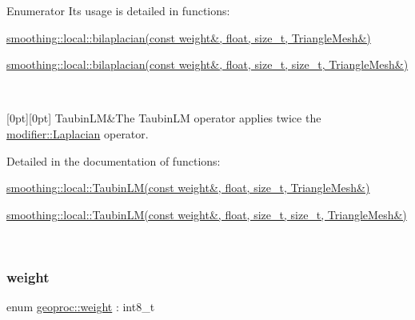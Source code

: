 \begin{DoxyEnumFields}{Enumerator}
Its usage is detailed in functions\+:
\begin{DoxyItemize}
\item \hyperlink{namespacegeoproc_1_1smoothing_1_1local_a5e2f0a2048d6fc14c372ea75bf70982f}{smoothing\+::local\+::bilaplacian(const weight\&, float, size\+\_\+t, Triangle\+Mesh\&)}
\item \hyperlink{namespacegeoproc_1_1smoothing_1_1local_a8a59216ea802c3ff64b4be4b904cfa5c}{smoothing\+::local\+::bilaplacian(const weight\&, float, size\+\_\+t, size\+\_\+t, Triangle\+Mesh\&)} 
\end{DoxyItemize}\\
\hline

[0pt][0pt]{}\mbox{\label{namespacegeoproc_a396280579199558902594f4df72c01c7ad69ec4945f39affa518f05fa077b00ae}} 
Taubin\+LM&The Taubin\+LM operator applies twice the \hyperlink{namespacegeoproc_a396280579199558902594f4df72c01c7a799723f39baf497704a3d39e7c03555f}{modifier\+::\+Laplacian} operator.

Detailed in the documentation of functions\+:
\begin{DoxyItemize}
\item \hyperlink{namespacegeoproc_1_1smoothing_1_1local_a17dcfcb442ae9cfbad9964b789b8c7a6}{smoothing\+::local\+::\+Taubin\+L\+M(const weight\&, float, size\+\_\+t, Triangle\+Mesh\&)}
\item \hyperlink{namespacegeoproc_1_1smoothing_1_1local_abea3fa692927cd47d165322f9791ddca}{smoothing\+::local\+::\+Taubin\+L\+M(const weight\&, float, size\+\_\+t, size\+\_\+t, Triangle\+Mesh\&)} 
\end{DoxyItemize}\\
\hline

\end{DoxyEnumFields}
\mbox{\label{namespacegeoproc_a12e5a10581b53b9dd9a509127527f843}} 
\subsubsection{\texorpdfstring{weight}{weight}}
{\footnotesize\ttfamily enum \hyperlink{namespacegeoproc_a12e5a10581b53b9dd9a509127527f843}{geoproc\+::weight} \+: int8\+\_\+t\hspace{0.3cm}{\ttfamily [strong]}}



